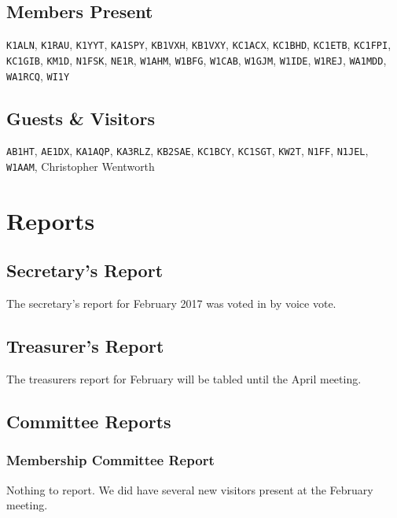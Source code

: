 \documentclass[10pt,letterpaper]{article}
\begin{document}
\subsection{Members Present}
\texttt{K1ALN},
\texttt{K1RAU},
\texttt{K1YYT},
\texttt{KA1SPY},
\texttt{KB1VXH},
\texttt{KB1VXY},
\texttt{KC1ACX},
\texttt{KC1BHD},
\texttt{KC1ETB},
\texttt{KC1FPI},
\texttt{KC1GIB},
\texttt{KM1D},
\texttt{N1FSK},
\texttt{NE1R},
\texttt{W1AHM},
\texttt{W1BFG},
\texttt{W1CAB},
\texttt{W1GJM},
\texttt{W1IDE},
\texttt{W1REJ},
\texttt{WA1MDD},
\texttt{WA1RCQ},
\texttt{WI1Y}

\subsection{Guests \& Visitors}
\texttt{AB1HT},
\texttt{AE1DX},
\texttt{KA1AQP},
\texttt{KA3RLZ},
\texttt{KB2SAE},
\texttt{KC1BCY},
\texttt{KC1SGT},
\texttt{KW2T},
\texttt{N1FF},
\texttt{N1JEL},
\texttt{W1AAM},
Christopher Wentworth


\section{Reports}

\subsection{Secretary's Report}
The secretary's report for February 2017 was voted in by voice vote.

\newpage
\subsection{Treasurer's Report}
The treasurers report for February will be tabled until the April meeting.

\subsection{Committee Reports}

\subsubsection{Membership Committee Report}
Nothing to report. We did have several new visitors present at the February meeting.
\end{document}
